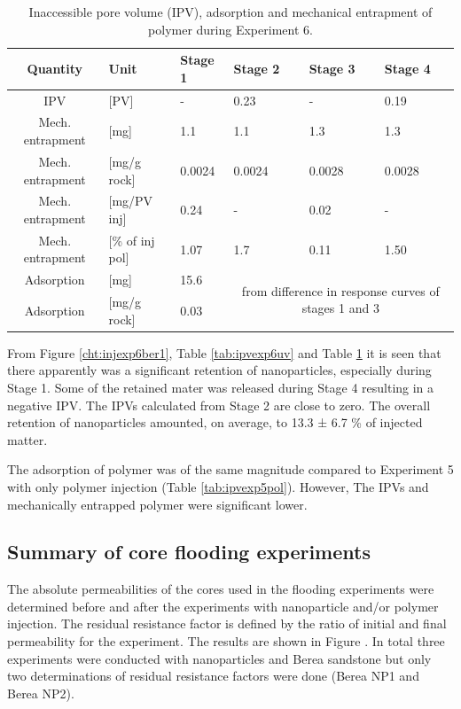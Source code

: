 \begin{table}[p]
\small
\centering
\caption{Inaccessible pore volume (IPV), adsorption and mechanical entrapment of polymer during Experiment 6.}
\label{tab:ipvexp6pol}
\begin{tabular}{c l l l l l } 
\toprule
\textbf{Quantity} & \textbf{Unit} & \textbf{Stage 1} & \textbf{Stage 2} & \textbf{Stage 3} & \textbf{Stage 4} \\ 
\midrule 
IPV                & [PV]           & -         & 0.23     & -         & 0.19     \\
Mech. entrapment   & [mg]          & 1.1       & 1.1      & 1.3       & 1.3       \\ 
Mech. entrapment   & [mg/g rock]   & 0.0024   & 0.0024     & 0.0028     & 0.0028     \\ 
Mech. entrapment   & [mg/PV inj]   & 0.24      & -         & 0.02      & -         \\
Mech. entrapment   & [\% of inj pol]& 1.07       & 1.7       & 0.11       & 1.50       \\ 
Adsorption         & [mg]          & 15.6      &   \multicolumn{3}{c}{\multirow{2}{15em}{from difference in response curves of stages 1 and 3}}        \\
Adsorption         & [mg/g rock]   & 0.03      &  \multicolumn{3}{c}{}    \\ 
\bottomrule
\end{tabular}
\end{table}


From Figure \ref{cht:injexp6ber1},  Table \ref{tab:ipvexp6uv} and Table \ref{tab:ipvexp6pol} it is seen that there apparently was a significant retention of nanoparticles, especially during Stage 1. Some of the retained mater was released during Stage 4 resulting in a negative IPV. The IPVs calculated from Stage 2 are close to zero. The overall retention of nanoparticles amounted, on average, to 13.3 ± 6.7 \% of injected matter.

The adsorption of polymer was of the same magnitude compared to Experiment 5 with only polymer injection (Table \ref{tab:ipvexp5pol}). However, The IPVs and mechanically entrapped polymer were significant lower.

\subsection{Summary of core flooding experiments}
The absolute permeabilities of the cores used in the flooding experiments were determined before and after the experiments with nanoparticle and/or polymer injection. The residual resistance factor is defined by the ratio of initial and final permeability for the experiment. The results are shown in Figure \what [5.1]. In total three experiments were conducted with nanoparticles and Berea sandstone but only two determinations of residual resistance factors were done (Berea NP1 and Berea NP2).


